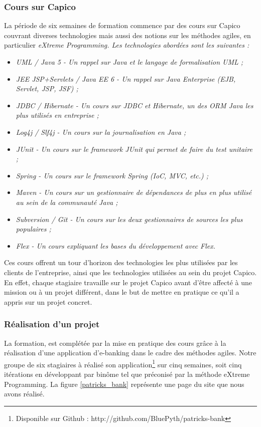 \subsubsection{Cours sur Capico}
La période de six semaines de formation commence par des cours sur Capico couvrant diverses technologies mais aussi des notions sur les méthodes agiles, en particulier \em{eXtreme Programming}. Les technologies abordées sont les suivantes :

\begin{itemize}
  \item \em{UML / Java 5} - Un rappel sur Java et le langage de formalisation UML ;
  \item \em{JEE JSP+Servlets / Java EE 6} - Un rappel sur Java Enterprise (EJB, Servlet, JSP, JSF) ;
  \item \em{JDBC / Hibernate} - Un cours sur JDBC et Hibernate, un des ORM Java les plus utilisés en entreprise ;
  \item \em{Log4j / Slf4j} - Un cours sur la journalisation en Java ;
  \item \em{JUnit} - Un cours sur le framework JUnit qui permet de faire du test unitaire ;
  \item \em{Spring} - Un cours sur le framework Spring (IoC, MVC, etc.) ;
  \item \em{Maven} - Un cours sur un gestionnaire de dépendances de plus en plus utilisé au sein de la communauté Java ;
  \item \em{Subversion / Git} - Un cours sur les deux gestionnaires de sources les plus populaires ;
  \item \em{Flex} - Un cours expliquant les bases du développement avec Flex.
\end{itemize}

Ces cours offrent un tour d'horizon des technologies les plus utilisées par les clients de l'entreprise, ainsi que les technologies utilisées au sein du projet Capico. En effet, chaque stagiaire travaille sur le projet Capico avant d'être affecté à une mission ou à un projet différent, dans le but de mettre en pratique ce qu'il a appris sur un projet concret.

\subsubsection{Réalisation d'un projet}

La formation, est complétée par la mise en pratique des cours grâce à la réalisation d'une application d'e-banking dans le cadre des méthodes agiles. Notre groupe de six stagiaires à réalisé son application\footnote{Disponible sur Github : http://github.com/BluePyth/patricks-bank} sur cinq semaines, soit cinq itérations en développant par binôme tel que préconisé par la méthode eXtreme Programming. La figure \ref{patricks_bank} représente une page du site que nous avons réalisé.

